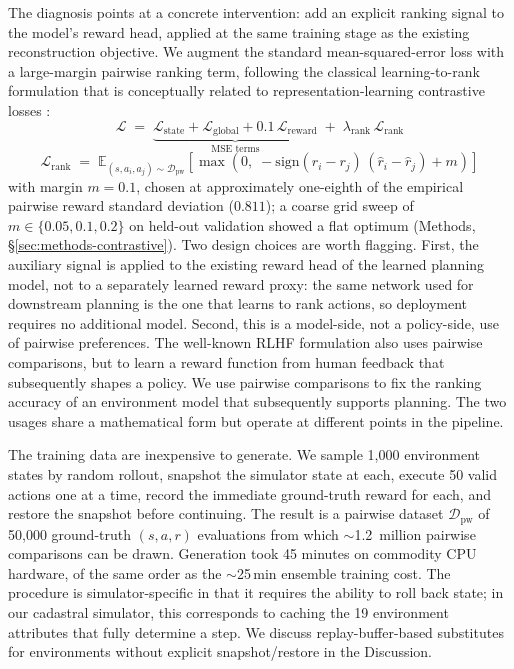 \documentclass[11pt]{article}
\begin{document}
The diagnosis points at a concrete intervention: add an explicit ranking signal to the model's reward head, applied at the same training stage as the existing reconstruction objective. We augment the standard mean-squared-error loss with a large-margin pairwise ranking term, following the classical learning-to-rank formulation \citep{herbrich2000large,joachims2002optimizing,burges2005learning,burges2010ranknet} that is conceptually related to representation-learning contrastive losses \citep{chen2020simple,oord2018representation}:
\begin{equation}
\mathcal{L} \;=\; \underbrace{\mathcal{L}_{\text{state}} + \mathcal{L}_{\text{global}} + 0.1\,\mathcal{L}_{\text{reward}}}_{\text{MSE terms}} \;+\; \lambda_{\text{rank}}\,\mathcal{L}_{\text{rank}}
\end{equation}
\begin{equation}
\mathcal{L}_{\text{rank}} \;=\; \mathbb{E}_{(s,a_i,a_j)\sim\mathcal{D}_{\text{pw}}}\!\left[\max\!\left(0,\; -\mathrm{sign}(r_i - r_j)\,(\hat{r}_i - \hat{r}_j) + m\right)\right]
\end{equation}
with margin $m{=}0.1$, chosen at approximately one-eighth of the empirical pairwise reward standard deviation ($0.811$); a coarse grid sweep of $m \in \{0.05, 0.1, 0.2\}$ on held-out validation showed a flat optimum (Methods, \S\ref{sec:methods-contrastive}). Two design choices are worth flagging. First, the auxiliary signal is applied to the existing reward head of the learned planning model, not to a separately learned reward proxy: the same network used for downstream planning is the one that learns to rank actions, so deployment requires no additional model. Second, this is a model-side, not a policy-side, use of pairwise preferences. The well-known RLHF formulation \citep{christiano2017deep,ouyang2022training} also uses pairwise comparisons, but to learn a reward function from human feedback that subsequently shapes a policy. We use pairwise comparisons to fix the ranking accuracy of an environment model that subsequently supports planning. The two usages share a mathematical form but operate at different points in the pipeline.

The training data are inexpensive to generate. We sample 1{,}000 environment states by random rollout, snapshot the simulator state at each, execute 50 valid actions one at a time, record the immediate ground-truth reward for each, and restore the snapshot before continuing. The result is a pairwise dataset $\mathcal{D}_{\text{pw}}$ of 50{,}000 ground-truth $(s, a, r)$ evaluations from which $\sim$1.2~million pairwise comparisons can be drawn. Generation took 45 minutes on commodity CPU hardware, of the same order as the $\sim$25\,min ensemble training cost. The procedure is simulator-specific in that it requires the ability to roll back state; in our cadastral simulator, this corresponds to caching the 19 environment attributes that fully determine a step. We discuss replay-buffer-based substitutes for environments without explicit snapshot/restore in the Discussion.
\end{document}
